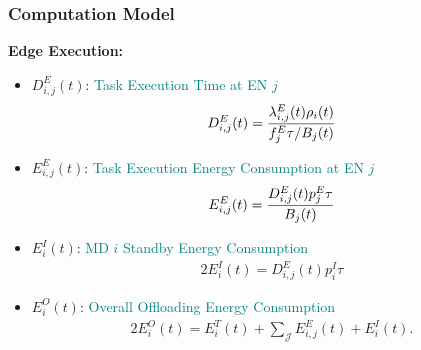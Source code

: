 \begin{frame}
	\frametitle{Computation Model}
	\textbf{Edge Execution:}
	
	\vfill
	
	\begin{itemize}[]
		
				\item $D_{i,j}^{E}(t)$:	\textcolor{teal}{Task Execution Time at EN $j$}
		\vspace{-2mm}
		\begin{alignat}{2}
			D_{i,j}^{E}(t) = { \lambda_{i,j}^{E}(t) \rho_i(t) \over f_j^{E} \tau /  B_j(t)}
			\label{14}  
		\end{alignat}
		
		
		
		\item $E_{i,j}^{E}(t)$:	\textcolor{teal}{Task Execution Energy Consumption at EN $j$}
		\vspace{-2mm}
		\begin{alignat}{2}
			E_{i,j}^{E}(t) = {D_{i,j}^{E}(t)  p_j^{E} \tau \over B_j(t)}  %
			\label{15}  
		\end{alignat}
		
		\item $E_i^{I}(t)$:	\textcolor{teal}{MD $i$ Standby Energy Consumption} 
		\begin{alignat}{2}
			E_i^{I}(t) = D_{i,j}^{E}(t) p_i^{I} \tau%
			\label{16}
		\end{alignat}
	
		\item $E_i^{O}(t)$: \textcolor{teal}{Overall Offloading Energy Consumption}
		\begin{alignat}{2}
			E_i^{O}(t) = E_i^{T}(t) + \sum_{\mathcal{J}} E_{i,j}^{E}(t) + E_i^{I}(t).
			\label{17}
		\end{alignat}
		
		


	\end{itemize}
\end{frame}
